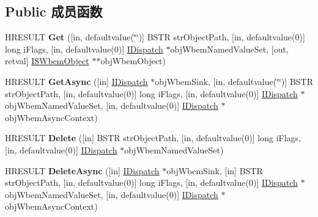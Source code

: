 \subsection*{Public 成员函数}
\begin{DoxyCompactItemize}
\item 
\mbox{\label{interface_wbem_scripting_1_1_i_s_wbem_services_a4f734f739476eb64eb1a97b2a74bfdda}} 
H\+R\+E\+S\+U\+LT {\bfseries Get} (\mbox{[}in, defaultvalue(\char`\"{}\char`\"{})\mbox{]} B\+S\+TR str\+Object\+Path, \mbox{[}in, defaultvalue(0)\mbox{]} long i\+Flags, \mbox{[}in, defaultvalue(0)\mbox{]} \hyperlink{interface_i_dispatch}{I\+Dispatch} $\ast$obj\+Wbem\+Named\+Value\+Set, \mbox{[}out, retval\mbox{]} \hyperlink{interface_wbem_scripting_1_1_i_s_wbem_object}{I\+S\+Wbem\+Object} $\ast$$\ast$obj\+Wbem\+Object)
\item 
\mbox{\label{interface_wbem_scripting_1_1_i_s_wbem_services_aef7b71ac3ab722e8688408b8c8bff971}} 
H\+R\+E\+S\+U\+LT {\bfseries Get\+Async} (\mbox{[}in\mbox{]} \hyperlink{interface_i_dispatch}{I\+Dispatch} $\ast$obj\+Wbem\+Sink, \mbox{[}in, defaultvalue(\char`\"{}\char`\"{})\mbox{]} B\+S\+TR str\+Object\+Path, \mbox{[}in, defaultvalue(0)\mbox{]} long i\+Flags, \mbox{[}in, defaultvalue(0)\mbox{]} \hyperlink{interface_i_dispatch}{I\+Dispatch} $\ast$obj\+Wbem\+Named\+Value\+Set, \mbox{[}in, defaultvalue(0)\mbox{]} \hyperlink{interface_i_dispatch}{I\+Dispatch} $\ast$obj\+Wbem\+Async\+Context)
\item 
\mbox{\label{interface_wbem_scripting_1_1_i_s_wbem_services_a0ae0ed691a9a9c0d82166a72f8f0881e}} 
H\+R\+E\+S\+U\+LT {\bfseries Delete} (\mbox{[}in\mbox{]} B\+S\+TR str\+Object\+Path, \mbox{[}in, defaultvalue(0)\mbox{]} long i\+Flags, \mbox{[}in, defaultvalue(0)\mbox{]} \hyperlink{interface_i_dispatch}{I\+Dispatch} $\ast$obj\+Wbem\+Named\+Value\+Set)
\item 
\mbox{\label{interface_wbem_scripting_1_1_i_s_wbem_services_a2a046fbcf233e71a3f6c1adedb9545f6}} 
H\+R\+E\+S\+U\+LT {\bfseries Delete\+Async} (\mbox{[}in\mbox{]} \hyperlink{interface_i_dispatch}{I\+Dispatch} $\ast$obj\+Wbem\+Sink, \mbox{[}in\mbox{]} B\+S\+TR str\+Object\+Path, \mbox{[}in, defaultvalue(0)\mbox{]} long i\+Flags, \mbox{[}in, defaultvalue(0)\mbox{]} \hyperlink{interface_i_dispatch}{I\+Dispatch} $\ast$obj\+Wbem\+Named\+Value\+Set, \mbox{[}in, defaultvalue(0)\mbox{]} \hyperlink{interface_i_dispatch}{I\+Dispatch} $\ast$obj\+Wbem\+Async\+Context)
$$
\end{DoxyCompactItemize}
